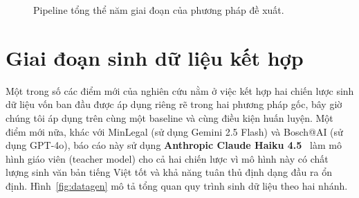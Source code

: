 \begin{figure}[ht]
\centering
{}
\caption{Pipeline tổng thể năm giai đoạn của phương pháp đề xuất.}
\label{fig:pipeline}
\end{figure}

\section{Giai đoạn sinh dữ liệu kết hợp}

Một trong số các điểm mới của nghiên cứu nằm ở việc kết hợp hai chiến lược sinh dữ liệu vốn ban đầu được áp dụng riêng rẽ trong hai phương pháp gốc, bây giờ chúng tôi áp dụng trên cùng một baseline và cùng điều kiện huấn luyện. Một điểm mới nữa, khác với MinLegal (sử dụng Gemini 2.5 Flash) và Bosch@AI (sử dụng GPT-4o), báo cáo này sử dụng \textbf{Anthropic Claude Haiku 4.5}~\cite{anthropic2025claude} làm mô hình giáo viên (teacher model) cho cả hai chiến lược vì mô hình này có chất lượng sinh văn bản tiếng Việt tốt và khả năng tuân thủ định dạng đầu ra ổn định. Hình~\ref{fig:datagen} mô tả tổng quan quy trình sinh dữ liệu theo hai nhánh.

